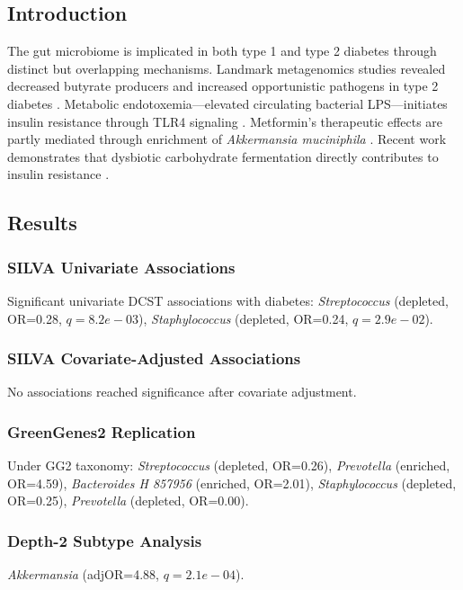 \documentclass[11pt,a4paper]{article}
\begin{document}
\subsection{Introduction}
The gut microbiome is implicated in both type 1 and type 2 diabetes through distinct but overlapping mechanisms. Landmark metagenomics studies revealed decreased butyrate producers and increased opportunistic pathogens in type 2 diabetes \cite{Qin2012_T2D,Karlsson2013_T2D_women}. Metabolic endotoxemia---elevated circulating bacterial LPS---initiates insulin resistance through TLR4 signaling \cite{Cani2007_endotoxemia}. Metformin's therapeutic effects are partly mediated through enrichment of \textit{Akkermansia muciniphila} \cite{Forslund2015_metformin}. Recent work demonstrates that dysbiotic carbohydrate fermentation directly contributes to insulin resistance \cite{Takeuchi2023_carbohydrate}.

\subsection{Results}
\subsubsection{SILVA Univariate Associations}
Significant univariate DCST associations with diabetes: \textit{Streptococcus} (depleted, OR=0.28, $q=8.2e-03$), \textit{Staphylococcus} (depleted, OR=0.24, $q=2.9e-02$).

\subsubsection{SILVA Covariate-Adjusted Associations}
No associations reached significance after covariate adjustment.

\subsubsection{GreenGenes2 Replication}
Under GG2 taxonomy: \textit{Streptococcus} (depleted, OR=0.26), \textit{Prevotella} (enriched, OR=4.59), \textit{Bacteroides H 857956} (enriched, OR=2.01), \textit{Staphylococcus} (depleted, OR=0.25), \textit{Prevotella} (depleted, OR=0.00).

\subsubsection{Depth-2 Subtype Analysis}
\textit{Akkermansia} (adjOR=4.88, $q=2.1e-04$).
\end{document}
